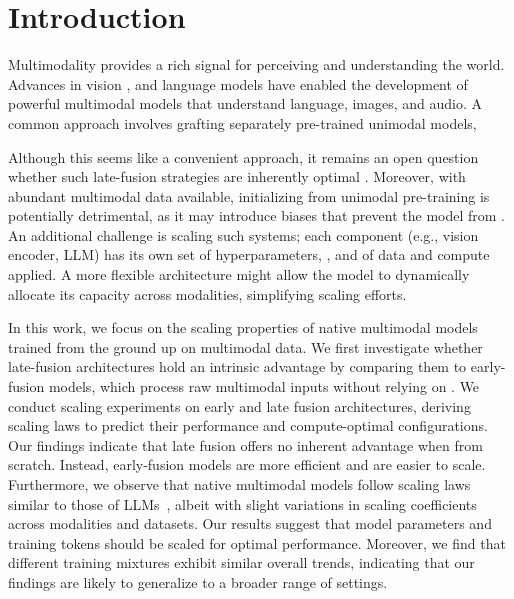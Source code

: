 
\section{Introduction}
\label{sec:intro}



Multimodality provides a rich signal for perceiving and understanding the world.
Advances in vision  
\citep{radford2021learning,oquab2023dinov2,zhai2023sigmoidsiglip,fini2024multimodalaimv2},
and language models \citep{achiam2023gpt4,team2023gemini,dubey2024llama3}  
have enabled the development of powerful multimodal models that understand
language, images, and audio. A common approach involves grafting separately
pre-trained unimodal models, 


Although this seems like a convenient approach, it remains an open question
whether such late-fusion strategies are inherently optimal .  Moreover, with abundant multimodal data
available, initializing from unimodal pre-training is potentially detrimental,
as it may introduce biases that prevent the model from .
An additional challenge is scaling such systems;  each component (e.g., vision
encoder, LLM) has its own set of hyperparameters, , and  of data and
compute applied. A more flexible architecture might allow the model to
dynamically allocate its capacity across modalities, simplifying scaling
efforts.


In this work, we focus on the scaling properties of native multimodal models
trained from the ground up on multimodal data. We first investigate whether
 late-fusion architectures hold an intrinsic
advantage by comparing them to early-fusion models, which process raw multimodal
inputs without relying on .  
We conduct scaling experiments on early and late fusion architectures, deriving
scaling laws to predict their performance and compute-optimal configurations.
Our findings indicate that late fusion offers no inherent advantage when
 from scratch. Instead, early-fusion models are more efficient and
are easier to scale. Furthermore, we observe that native multimodal models
follow scaling laws similar to those of LLMs~\citep{hoffmann2022training},
albeit with slight variations in scaling coefficients across modalities and
datasets. Our results suggest that model parameters and training tokens should
be scaled  for optimal performance.
Moreover, we find that different  training mixtures exhibit
similar overall trends, indicating that our findings are likely to generalize to
a broader range of settings.



